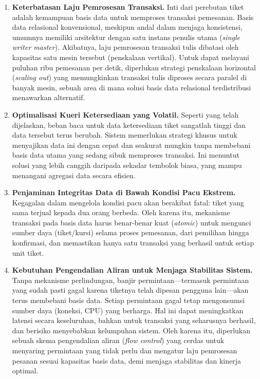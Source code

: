 \begin{enumerate}
    \item \textbf{Keterbatasan Laju Pemrosesan Transaksi.} Inti dari perebutan tiket adalah kemampuan basis data untuk memproses transaksi pemesanan. Basis data relasional konvensional, meskipun andal dalam menjaga konsistensi, umumnya memiliki arsitektur dengan satu instans penulis utama (\textit{single writer master}). Akibatnya, laju pemrosesan transaksi tulis dibatasi oleh kapasitas satu mesin tersebut (penskalaan vertikal). Untuk dapat melayani puluhan ribu pemesanan per detik, diperlukan strategi penskalaan horizontal (\textit{scaling out}) yang memungkinkan transaksi tulis diproses secara paralel di banyak mesin, sebuah area di mana solusi basis data relasional terdistribusi menawarkan alternatif.

    \item \textbf{Optimalisasi Kueri Ketersediaan yang Volatil.} Seperti yang telah dijelaskan, beban baca untuk data ketersediaan tiket sangatlah tinggi dan data tersebut terus berubah. Sistem memerlukan strategi khusus untuk menyajikan data ini dengan cepat dan seakurat mungkin tanpa membebani basis data utama yang sedang sibuk memproses transaksi. Ini menuntut solusi yang lebih canggih daripada sekadar tembolok biasa, yang mampu menangani agregasi data secara efisien.

    \item \textbf{Penjaminan Integritas Data di Bawah Kondisi Pacu Ekstrem.} Kegagalan dalam mengelola kondisi pacu akan berakibat fatal: tiket yang sama terjual kepada dua orang berbeda. Oleh karena itu, mekanisme transaksi pada basis data harus benar-benar kuat (\textit{atomic}) untuk mengunci sumber daya (tiket/kursi) selama proses pemesanan, dari pemilihan hingga konfirmasi, dan memastikan hanya satu transaksi yang berhasil untuk setiap unit tiket.

    \item \textbf{Kebutuhan Pengendalian Aliran untuk Menjaga Stabilitas Sistem.} Tanpa mekanisme perlindungan, banjir permintaan—termasuk permintaan yang sudah pasti gagal karena tiketnya telah dipesan pengguna lain—akan terus membebani basis data. Setiap permintaan gagal tetap mengonsumsi sumber daya (koneksi, CPU) yang berharga. Hal ini dapat meningkatkan latensi secara keseluruhan, bahkan untuk transaksi yang seharusnya berhasil, dan berisiko menyebabkan kelumpuhan sistem. Oleh karena itu, diperlukan sebuah skema pengendalian aliran (\textit{flow control}) yang cerdas untuk menyaring permintaan yang tidak perlu dan mengatur laju pemrosesan pesanan sesuai kapasitas basis data, demi menjaga stabilitas dan kinerja optimal.
\end{enumerate}
